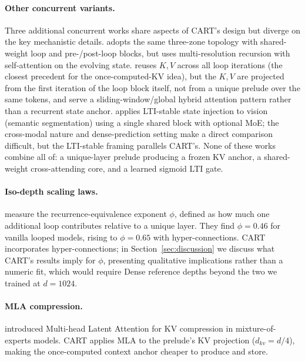 \documentclass{article}
\newcommand{\cart}{\textsc{CART}}
\begin{document}
\paragraph{Other concurrent variants.}
Three additional concurrent works share aspects of \cart{}'s design but diverge on the key mechanistic details. \citet{spiralformer2026} adopts the same three-zone topology with shared-weight loop and pre-/post-loop blocks, but uses multi-resolution recursion with self-attention on the evolving state. \citet{plt2025parallel} reuses $K, V$ across all loop iterations (the closest precedent for the once-computed-KV idea), but the $K, V$ are projected from the first iteration of the loop block itself, not from a unique prelude over the same tokens, and serve a sliding-window/global hybrid attention pattern rather than a recurrent state anchor. \citet{rdvit2026} applies LTI-stable state injection to vision (semantic segmentation) using a single shared block with optional MoE; the cross-modal nature and dense-prediction setting make a direct comparison difficult, but the LTI-stable framing parallels \cart{}'s. None of these works combine all of: a unique-layer prelude producing a frozen KV anchor, a shared-weight cross-attending core, and a learned sigmoid LTI gate.

\paragraph{Iso-depth scaling laws.}
\citet{schwethelm2026isodepth} measure the recurrence-equivalence exponent $\phi$, defined as how much one additional loop contributes relative to a unique layer. They find $\phi = 0.46$ for vanilla looped models, rising to $\phi = 0.65$ with hyper-connections. \cart{} incorporates hyper-connections; in Section~\ref{sec:discussion} we discuss what \cart{}'s results imply for $\phi$, presenting qualitative implications rather than a numeric fit, which would require Dense reference depths beyond the two we trained at $d{=}1024$.

\paragraph{MLA compression.}
\citet{liu2024deepseek} introduced Multi-head Latent Attention for KV compression in mixture-of-experts models. \cart{} applies MLA to the prelude's KV projection ($d_{kv} = d/4$), making the once-computed context anchor cheaper to produce and store.

\end{document}
